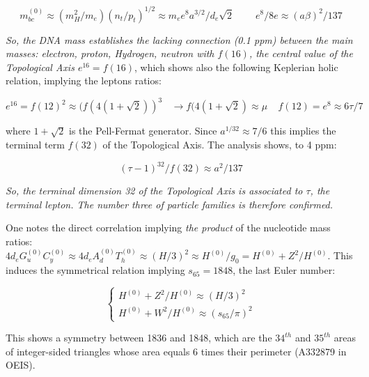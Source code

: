 \documentclass[a4paper,9pt]{article}
\newcounter{row}
\begin{document}
\begin{equation}
m_{bc}^{(0)} \approx (m_H^2/m_e)(n_t/p_t)^{1/2}  \approx m_ee^8 a^{3/2}/d_e \sqrt 2  ~~~~~~~~~~ e^8/8e \approx (a\beta)^2/137
 \end{equation}

\textit{So, the DNA mass establishes the lacking connection (0.1 ppm) between the main masses: electron, proton, Hydrogen, neutron with $f(16)$, the central value of the Topological Axis $e^{16} = f(16)$}, which shows also the following Keplerian holic relation, implying the leptons ratios: 

\begin{equation}
e^{16} = f(12)^2 \approx (f(4(1+\sqrt 2))^3 ~~~~ \rightarrow  f(4(1+\sqrt 2) \approx \mu ~~~~~ f(12) = e^8 \approx 6\tau/7
 \end{equation}

where $1+\sqrt 2$ is the Pell-Fermat generator. Since $a^{1/32}\approx 7/6$ this implies the terminal term $f(32)$ of the Topological Axis. The analysis shows, to 4 ppm:

\begin{equation}
(\tau -1)^{32}/f(32) \approx a^2/137
 \end{equation}
 
 \textit{So, the terminal dimension 32 of the Topological Axis is associated to $\tau$, the terminal lepton. The number three of particle families is therefore confirmed.}

One notes the direct correlation implying \textit{the product} of the nucleotide mass ratios: $4d_e G_u^{(0)} C_y^{(0)} \approx 4d_e A_d^{(0)} T_h^{(0)} \approx (H/3)^2 \approx H^{(0)}/g_0 = H^{(0)} + Z^2/H^{(0)}$. This induces the symmetrical relation implying $s_{65} = 1848$, the last Euler number:

\begin{equation}
 \left\{
    \begin{array}{ll}
        H^{(0)} + Z^2/H^{(0)} \approx (H/3)^2\\
        H^{(0)} + W^2/H^{(0)} \approx (s_{65}/\pi)^2
    \end{array}
\right.
\end{equation}

This shows a symmetry between 1836 and 1848, which are the $34^{th}$ and $35^{th}$ areas of integer-sided triangles whose area equals 6 times their perimeter (A332879 in OEIS).

\end{document}
